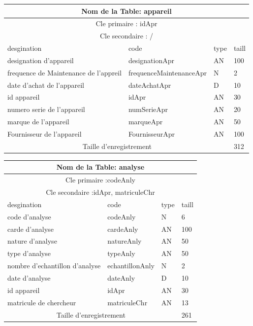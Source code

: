 \vspace{2cm}

\begin{tabular}{ |p{5cm}||p{4cm}|p{3cm}|p{3cm}|  }
    \hline
    \multicolumn{4}{|c|}{Nom de la Table: appareil } \\
    \hline
    \multicolumn{4}{|c|}{Cle primaire : idApr} \\
    \hline
    \multicolumn{4}{|c|}{Cle secondaire : / } \\
    \hline
    \hline
    desgination&code&type&taill \\
    \hline
    designation d'appareil&designationApr&AN&100 \\
    frequence de Maintenance de l'appreil&frequenceMaintenanceApr&N&2 \\
    date d'achat de l'appareil&dateAchatApr&D&10 \\
    id appareil&idApr&AN&30 \\
    numero serie de l'appareil&numSerieApr&AN&20 \\
    marque  de l'appareil&marqueApr&AN&50 \\
    Fournisseur  de l'appareil&FournisseurApr&AN&100 \\
    \hline
    \hline
    \multicolumn{3}{|c|}{Taille d’enregistrement} & 312\\
    \hline
\end{tabular}

\vspace{2cm}

\begin{tabular}{ |p{5cm}||p{4cm}|p{3cm}|p{3cm}|  }
    \hline
    \multicolumn{4}{|c|}{Nom de la Table: analyse} \\
    \hline
    \multicolumn{4}{|c|}{Cle primaire :codeAnly } \\
    \hline
    \multicolumn{4}{|c|}{Cle secondaire :idApr, matriculeChr  } \\
    \hline
    \hline
    desgination&code&type&taill \\
    \hline
    code d'analyse&codeAnly&N&6 \\
    carde d'analyse&cardeAnly&AN&100 \\
    nature d'analyse&natureAnly&AN&50 \\
    type d'analyse&typeAnly&AN&50 \\
    nombre d'echantillon d'analyse&echantillonAnly&N&2 \\
    date d'analyse&dateAnly&D&10\\
    id appareil&idApr&AN&30 \\
    matricule de chercheur&matriculeChr&AN&13 \\
    \hline
    \hline
    \multicolumn{3}{|c|}{Taille d’enregistrement} & 261\\
    \hline
\end{tabular}

